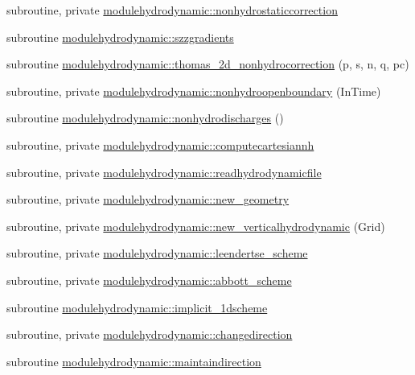 \begin{DoxyCompactItemize}
\item 
subroutine, private \mbox{\hyperlink{namespacemodulehydrodynamic_abc8e7cbc6bd77b58f41b41db117c979b}{modulehydrodynamic\+::nonhydrostaticcorrection}}
\item 
subroutine \mbox{\hyperlink{namespacemodulehydrodynamic_a38e7a7184b963c8e5a55ddb911180c72}{modulehydrodynamic\+::szzgradients}}
\item 
subroutine \mbox{\hyperlink{namespacemodulehydrodynamic_ae703b0f1de9b2461040ee74aa6867ff7}{modulehydrodynamic\+::thomas\+\_\+2d\+\_\+nonhydrocorrection}} (p, s, n, q, pc)
\item 
subroutine, private \mbox{\hyperlink{namespacemodulehydrodynamic_aa8e7eaaf3d7106144fb138675637be7e}{modulehydrodynamic\+::nonhydroopenboundary}} (In\+Time)
\item 
subroutine \mbox{\hyperlink{namespacemodulehydrodynamic_a5a21356710281101f911022fe04dd47d}{modulehydrodynamic\+::nonhydrodischarges}} ()
\item 
subroutine, private \mbox{\hyperlink{namespacemodulehydrodynamic_a40e6066d8e63726036522b3dcddee56a}{modulehydrodynamic\+::computecartesiannh}}
\item 
subroutine, private \mbox{\hyperlink{namespacemodulehydrodynamic_a2b422929c9c1ce1f75858893e788082f}{modulehydrodynamic\+::readhydrodynamicfile}}
\item 
subroutine, private \mbox{\hyperlink{namespacemodulehydrodynamic_a348f4fbd3311ec9fc2bcc611faaa34be}{modulehydrodynamic\+::new\+\_\+geometry}}
\item 
subroutine, private \mbox{\hyperlink{namespacemodulehydrodynamic_a9865dafdd7098ab67142ed4fe05d5548}{modulehydrodynamic\+::new\+\_\+verticalhydrodynamic}} (Grid)
\item 
subroutine, private \mbox{\hyperlink{namespacemodulehydrodynamic_a8ca7371a9688becd96976013be92880a}{modulehydrodynamic\+::leendertse\+\_\+scheme}}
\item 
subroutine, private \mbox{\hyperlink{namespacemodulehydrodynamic_ab24f3a1aadd0e5ea548005ab690517a5}{modulehydrodynamic\+::abbott\+\_\+scheme}}
\item 
subroutine \mbox{\hyperlink{namespacemodulehydrodynamic_aad271ff300fe974ab4d13ed6f1bd315d}{modulehydrodynamic\+::implicit\+\_\+1dscheme}}
\item 
subroutine, private \mbox{\hyperlink{namespacemodulehydrodynamic_a21da40cf926fb3d12ccc40743a115da6}{modulehydrodynamic\+::changedirection}}
\item 
subroutine \mbox{\hyperlink{namespacemodulehydrodynamic_a178f5e060ebc6d1ddcb0e70a9c9e95c2}{modulehydrodynamic\+::maintaindirection}}

\end{DoxyCompactItemize}
